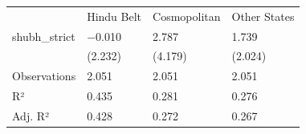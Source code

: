 \begin{tabular}{llll}
& Hindu Belt & Cosmopolitan & Other States \\
shubh\_strict & \num{-0.010} & \num{2.787} & \num{1.739} \\
& (\num{2.232}) & (\num{4.179}) & (\num{2.024}) \\
Observations & \num{2,051} & \num{2,051} & \num{2,051} \\
R² & \num{0.435} & \num{0.281} & \num{0.276} \\
Adj. R² & \num{0.428} & \num{0.272} & \num{0.267} \\
\end{tabular}
